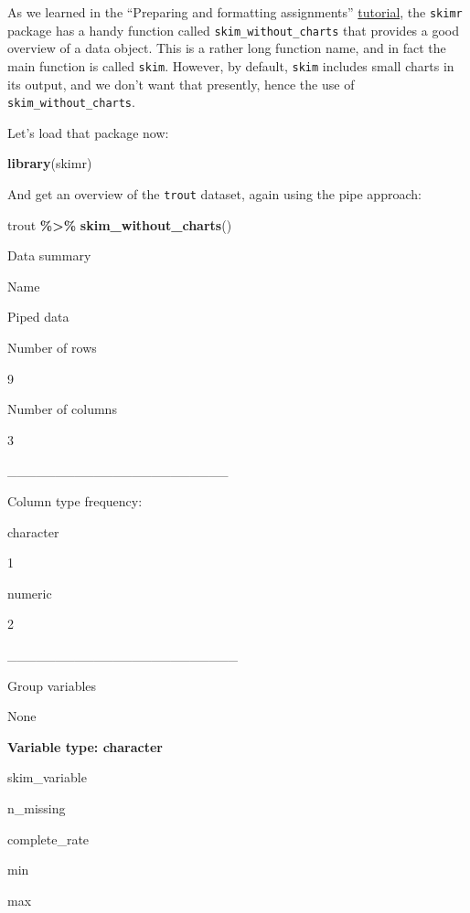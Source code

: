 \documentclass[
]{book}
\newenvironment{Shaded}{\begin{snugshade}}{\end{snugshade}}
\newcommand{\FunctionTok}[1]{\textcolor[rgb]{0.13,0.29,0.53}{\textbf{#1}}}
\newcommand{\NormalTok}[1]{#1}
\newcommand{\SpecialCharTok}[1]{\textcolor[rgb]{0.81,0.36,0.00}{\textbf{#1}}}
\begin{document}
As we learned in the ``Preparing and formatting assignments'' \hyperref[example_answer]{tutorial}, the \texttt{skimr} package has a handy function called \texttt{skim\_without\_charts} that provides a good overview of a data object. This is a rather long function name, and in fact the main function is called \texttt{skim}. However, by default, \texttt{skim} includes small charts in its output, and we don't want that presently, hence the use of \texttt{skim\_without\_charts}.

Let's load that package now:

\begin{Shaded}
\begin{Highlighting}[]
\FunctionTok{library}\NormalTok{(skimr)}
\end{Highlighting}
\end{Shaded}

And get an overview of the \texttt{trout} dataset, again using the pipe approach:

\begin{Shaded}
\begin{Highlighting}[]
\NormalTok{trout }\SpecialCharTok{\%\textgreater{}\%}
  \FunctionTok{skim\_without\_charts}\NormalTok{()}
\end{Highlighting}
\end{Shaded}

\label{tab:unnamed-chunk-24}Data summary

Name

Piped data

Number of rows

9

Number of columns

3

\_\_\_\_\_\_\_\_\_\_\_\_\_\_\_\_\_\_\_\_\_\_\_

Column type frequency:

character

1

numeric

2

\_\_\_\_\_\_\_\_\_\_\_\_\_\_\_\_\_\_\_\_\_\_\_\_

Group variables

None

\textbf{Variable type: character}

skim\_variable

n\_missing

complete\_rate

min

max
\end{document}

